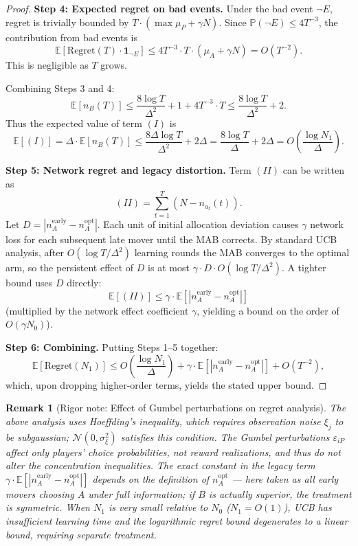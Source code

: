\documentclass[12pt,a4paper]{article}
\newtheorem{remark}[theorem]{Remark}
\newcommand{\Regret}{\mathrm{Regret}}
\begin{document}
\begin{proof}
\textbf{Step 4: Expected regret on bad events.}
Under the bad event $\neg E$, regret is trivially bounded by $T\cdot (\max \mu_P + \gamma N)$.
Since $\mathbb{P}(\neg E) \leq 4T^{-3}$, the contribution from bad events is
\[
\mathbb{E}[\Regret(T)\cdot \mathbf{1}_{\neg E}] \leq 4T^{-3} \cdot T \cdot (\mu_A + \gamma N) = O(T^{-2}).
\]
This is negligible as $T$ grows.

Combining Steps 3 and 4:
\[
\mathbb{E}[n_B(T)] \leq \frac{8\log T}{\Delta^2} + 1 + 4T^{-3}\cdot T \leq \frac{8\log T}{\Delta^2} + 2.
\]
Thus the expected value of term $(I)$ is
\[
\mathbb{E}[(I)] = \Delta \cdot \mathbb{E}[n_B(T)] \leq \frac{8\Delta\log T}{\Delta^2} + 2\Delta = \frac{8\log T}{\Delta} + 2\Delta = O\!\left(\frac{\log N_1}{\Delta}\right).
\]

\textbf{Step 5: Network regret and legacy distortion.}
Term $(II)$ can be written as
\[
(II) = \sum_{t=1}^{T} (N - n_{a_t}(t)).
\]
Let $D = |n_A^{\text{early}} - n_A^{\text{opt}}|$. Each unit of initial allocation deviation causes $\gamma$ network loss for each subsequent late mover until the MAB corrects. By standard UCB analysis, after $O(\log T/\Delta^2)$ learning rounds the MAB converges to the optimal arm, so the persistent effect of $D$ is at most $\gamma \cdot D \cdot O(\log T/\Delta^2)$.
A tighter bound uses $D$ directly:
\[
\mathbb{E}[(II)] \leq \gamma\cdot \mathbb{E}[|n_A^{\text{early}} - n_A^{\text{opt}}|]
\]
(multiplied by the network effect coefficient $\gamma$, yielding a bound on the order of $O(\gamma N_0)$).

\textbf{Step 6: Combining.}
Putting Steps 1--5 together:
\[
\mathbb{E}[\Regret(N_1)] \leq O\!\left(\frac{\log N_1}{\Delta}\right) + \gamma\cdot\mathbb{E}\!\left[|n_A^{\text{early}} - n_A^{\text{opt}}|\right] + O(T^{-2}),
\]
which, upon dropping higher-order terms, yields the stated upper bound.
\end{proof}

\begin{remark}[Rigor note: Effect of Gumbel perturbations on regret analysis]
The above analysis uses Hoeffding's inequality, which requires observation noise $\xi_j$ to be subgaussian; $\mathcal{N}(0,\sigma_\xi^2)$ satisfies this condition. The Gumbel perturbations $\varepsilon_{iP}$ affect only players' choice probabilities, not reward realizations, and thus do not alter the concentration inequalities.
The exact constant in the legacy term $\gamma\cdot\mathbb{E}[|n_A^{\text{early}}-n_A^{\text{opt}}|]$ depends on the definition of $n_A^{\text{opt}}$ --- here taken as all early movers choosing $A$ under full information; if $B$ is actually superior, the treatment is symmetric. When $N_1$ is very small relative to $N_0$ ($N_1=O(1)$), UCB has insufficient learning time and the logarithmic regret bound degenerates to a linear bound, requiring separate treatment.
\end{remark}
\end{document}
